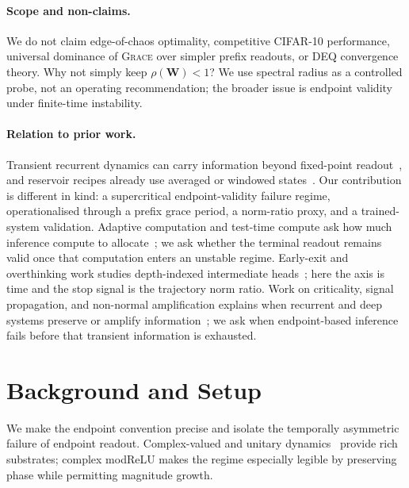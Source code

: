 \documentclass{article}
\theoremstyle{remark}
\newcommand{\bW}{\mathbf{W}}
\newcommand{\grace}{\textnormal{\textsc{Grace}}}
\begin{document}
\paragraph{Scope and non-claims.}
We do not claim edge-of-chaos optimality, competitive CIFAR-10 performance,
universal dominance of \grace{} over simpler prefix readouts, or DEQ
convergence theory. Why not simply keep $\rho(\bW)<1$? We use spectral radius
as a controlled probe, not an operating recommendation; the broader issue is
endpoint validity under finite-time instability.

\paragraph{Relation to prior work.}
Transient recurrent dynamics can carry information beyond fixed-point
readout~\citep{maass2002real,jaeger2001echo}, and reservoir recipes already
use averaged or windowed states~\citep{lukosevicius2012practical}. Our
contribution is different in kind: a supercritical endpoint-validity failure
regime, operationalised through a prefix grace period, a norm-ratio proxy, and
a trained-system validation. Adaptive computation and test-time compute ask how
much inference compute to allocate~\citep{graves2016adaptive,
banino2021pondernet,snell2024testtime,geiping2025recurrent}; we ask whether
the terminal readout remains valid once that computation enters an unstable
regime. Early-exit and overthinking work studies depth-indexed intermediate
heads~\citep{teerapittayanon2016branchynet,kaya2019shallow,
elhoushi2024layerskip}; here the axis is time and the stop signal is the
trajectory norm ratio. Work on criticality, signal propagation, and non-normal
amplification explains when recurrent and deep systems preserve or amplify
information~\citep{bertschinger2004real,dambre2012information,
poole2016exponential,schoenholz2017deep,trefethen2005spectra,
hennequin2012nonnormal,kerg2019nonnormal}; we ask when endpoint-based
inference fails before that transient information is exhausted.


\section{Background and Setup}
\label{sec:setup}

We make the endpoint convention precise and isolate the temporally asymmetric
failure of endpoint readout. Complex-valued and unitary dynamics~\citep{
trabelsi2018deep,arjovsky2016unitary} provide rich substrates; complex modReLU
makes the regime especially legible by preserving phase while permitting
magnitude growth.
\end{document}
